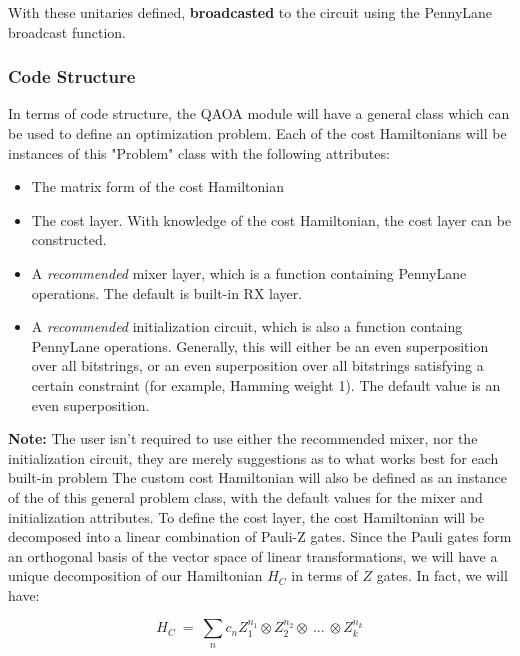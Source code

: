 \documentclass{article}
\begin{document}
With these unitaries defined, \textbf{broadcasted} to the circuit 
using the PennyLane broadcast function.

\subsubsection{Code Structure}

In terms of code structure, the QAOA module will have a general class which can 
be used to define an optimization problem. Each of the cost Hamiltonians will 
be instances of this "Problem" class with the following attributes:

   \begin{itemize}

	   \item The matrix form of the cost Hamiltonian
	   \item The cost layer. With knowledge of the cost Hamiltonian, the cost 
   		 layer can be constructed.
	   \item A \textit{recommended} mixer layer, which is a function containing
                 PennyLane operations. The default is built-in RX layer.
	   \item A \textit{recommended} initialization circuit, which is also a function 
                 containg PennyLane operations. Generally, this will either be an 
   		 even superposition over all bitstrings, or an even superposition over all 
   		 bitstrings satisfying a certain constraint (for example, Hamming weight 1).
   		 The default value is an even superposition.
   \end{itemize}

\noindent
\textbf{Note:} The user isn't required to use either the recommended mixer, nor the
initialization circuit, they are merely suggestions as to what works best 
for each built-in problem
\newline\newline
\noindent
The custom cost Hamiltonian will also be defined as an instance of the of
this general problem class, with the default values for the mixer and initialization 
attributes. To define the cost layer, the cost Hamiltonian will be decomposed 
into a linear combination of Pauli-Z gates. Since the Pauli gates form an orthogonal
basis of the vector space of linear transformations, we will have a unique decomposition
of our Hamiltonian $H_C$ in terms of $Z$ gates. In fact, we will have:

$$H_C \ = \ \displaystyle\sum_{n} c_n Z_1^{n_1} \otimes Z_2^{n_2} \otimes \ ... \ \otimes Z_{k}^{n_k}$$
\end{document}
